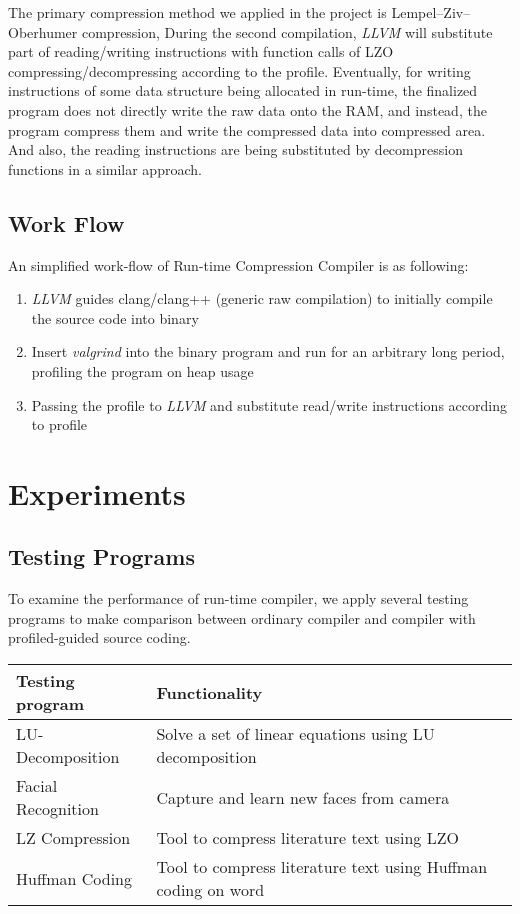 \documentclass[]{article}
\begin{document}
	The primary compression method we applied in the project is Lempel–Ziv–Oberhumer compression, During the second compilation, \textit{LLVM} will substitute part of reading/writing instructions with function calls of LZO compressing/decompressing according to the profile. Eventually, for writing instructions of some data structure being allocated in run-time, the finalized program does not directly write the raw data onto the RAM, and instead, the program compress them and write the compressed data into compressed area. And also, the reading instructions are being substituted by decompression functions in a similar approach. \par 
	\subsection{Work Flow}
	An simplified work-flow of Run-time Compression Compiler is as following:
	\begin{enumerate}
		\item \textit{LLVM} guides clang/clang++ (generic raw compilation) to initially compile the source code into binary
		\item Insert \textit{valgrind} into the binary program and run for an arbitrary long period, profiling the program on heap usage
		\item Passing the profile to \textit{LLVM} and substitute read/write instructions according to profile
	\end{enumerate} 
	
\section{Experiments}
	\subsection{Testing Programs}
	To examine the performance of run-time compiler, we apply several testing programs to make comparison between ordinary compiler and compiler with profiled-guided source coding. 
	\begin{table}[H]
		\begin{tabular}{|l|l|}
	        \hline
	        Testing program & Functionality \\ \hline 
			LU-Decomposition                      & Solve a set of linear equations using LU decomposition        \\ \hline
			Facial Recognition                    & Capture and learn new faces from camera                       \\ \hline
			LZ Compression                        & Tool to compress literature text using LZO                    \\ \hline
			Huffman Coding                        & Tool to compress literature text using Huffman coding on word \\ \hline
		\end{tabular}
	\end{table}
	
\end{document}
